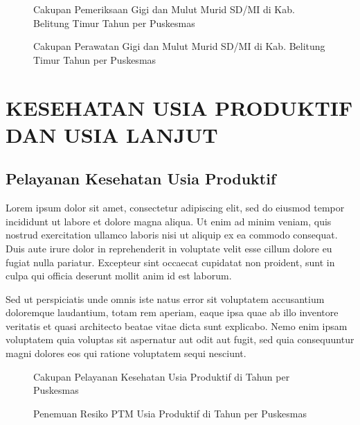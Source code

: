 \begin{figure}[H]
	\centering
	\caption{Cakupan Pemeriksaan Gigi dan Mulut Murid SD/MI di Kab. Belitung Timur Tahun \tP per Puskesmas}
	\label{fig:Cakupan-Pelayanan-Kesehatan-Gigi-Mulut-SD}
\end{figure}

\begin{figure}[H]
	\centering
	\caption{Cakupan Perawatan Gigi dan Mulut Murid SD/MI di Kab. Belitung Timur Tahun \tP per Puskesmas}
	\label{fig:Cakupan-Pelayanan-Kesehatan-Gigi-Mulut-SD-Dirawat}
\end{figure}

\section{KESEHATAN USIA PRODUKTIF DAN USIA LANJUT}
\subsection{Pelayanan Kesehatan Usia Produktif}
Lorem ipsum dolor sit amet, consectetur adipiscing elit, sed do eiusmod tempor incididunt ut labore et dolore magna aliqua. Ut enim ad minim veniam, quis nostrud exercitation ullamco laboris nisi ut aliquip ex ea commodo consequat. Duis aute irure dolor in reprehenderit in voluptate velit esse cillum dolore eu fugiat nulla pariatur. Excepteur sint occaecat cupidatat non proident, sunt in culpa qui officia deserunt mollit anim id est laborum.

Sed ut perspiciatis unde omnis iste natus error sit voluptatem accusantium doloremque laudantium, totam rem aperiam, eaque ipsa quae ab illo inventore veritatis et quasi architecto beatae vitae dicta sunt explicabo. Nemo enim ipsam voluptatem quia voluptas sit aspernatur aut odit aut fugit, sed quia consequuntur magni dolores eos qui ratione voluptatem sequi nesciunt.

\begin{figure}[H]
    \centering
    \caption{Cakupan Pelayanan Kesehatan Usia Produktif di \namaKabupaten Tahun \tP per Puskesmas}
    \label{fig:Cakupan-Yankes-Usprod}
\end{figure}

\begin{figure}[H]
    \centering
    \caption{Penemuan Resiko PTM Usia Produktif di \namaKabupaten Tahun \tP per Puskesmas}
    \label{fig:Cakupan-Resiko-PTM-Usprod}
\end{figure}

